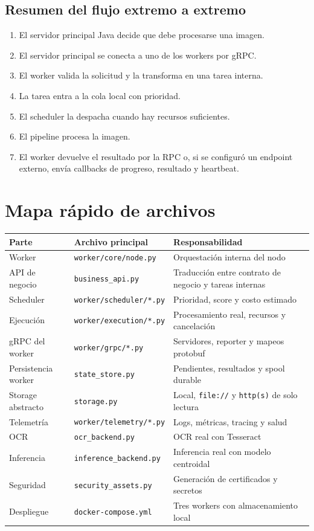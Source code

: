 \documentclass[11pt]{article}
\begin{document}
\subsection{Resumen del flujo extremo a extremo}
\begin{enumerate}
\item El servidor principal Java decide que debe procesarse una imagen.
\item El servidor principal se conecta a uno de los workers por gRPC.
\item El worker valida la solicitud y la transforma en una tarea interna.
\item La tarea entra a la cola local con prioridad.
\item El scheduler la despacha cuando hay recursos suficientes.
\item El pipeline procesa la imagen.
\item El worker devuelve el resultado por la RPC o, si se configuró un endpoint externo, envía callbacks de progreso, resultado y heartbeat.
\end{enumerate}

\section{Mapa rápido de archivos}
\begin{longtable}{>{\raggedright\arraybackslash}p{3.4cm} >{\raggedright\arraybackslash}p{4.2cm} >{\raggedright\arraybackslash}p{6.5cm}}
\toprule
\textbf{Parte} & \textbf{Archivo principal} & \textbf{Responsabilidad} \\
\midrule
Worker & \texttt{worker/core/node.py} & Orquestación interna del nodo \\
API de negocio & \texttt{business\_api.py} & Traducción entre contrato de negocio y tareas internas \\
Scheduler & \texttt{worker/scheduler/*.py} & Prioridad, score y costo estimado \\
Ejecución & \texttt{worker/execution/*.py} & Procesamiento real, recursos y cancelación \\
gRPC del worker & \texttt{worker/grpc/*.py} & Servidores, reporter y mapeos protobuf \\
Persistencia worker & \texttt{state\_store.py} & Pendientes, resultados y spool durable \\
Storage abstracto & \texttt{storage.py} & Local, \texttt{file://} y \texttt{http(s)} de solo lectura \\
Telemetría & \texttt{worker/telemetry/*.py} & Logs, métricas, tracing y salud \\
OCR & \texttt{ocr\_backend.py} & OCR real con Tesseract \\
Inferencia & \texttt{inference\_backend.py} & Inferencia real con modelo centroidal \\
Seguridad & \texttt{security\_assets.py} & Generación de certificados y secretos \\
Despliegue & \texttt{docker-compose.yml} & Tres workers con almacenamiento local \\
\bottomrule
\end{longtable}
\end{document}
